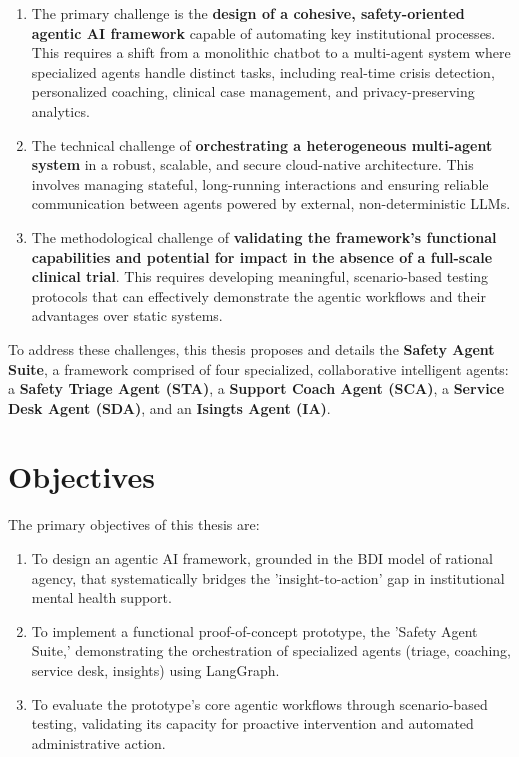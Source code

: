 \begin{enumerate}
    \item The primary challenge is the \textbf{design of a cohesive, safety-oriented agentic AI framework} capable of automating key institutional processes. This requires a shift from a monolithic chatbot to a multi-agent system where specialized agents handle distinct tasks, including real-time crisis detection, personalized coaching, clinical case management, and privacy-preserving analytics.

    \item The technical challenge of \textbf{orchestrating a heterogeneous multi-agent system} in a robust, scalable, and secure cloud-native architecture. This involves managing stateful, long-running interactions and ensuring reliable communication between agents powered by external, non-deterministic LLMs.

    \item The methodological challenge of \textbf{validating the framework's functional capabilities and potential for impact in the absence of a full-scale clinical trial}. This requires developing meaningful, scenario-based testing protocols that can effectively demonstrate the agentic workflows and their advantages over static systems.
\end{enumerate}

To address these challenges, this thesis proposes and details the \textbf{Safety Agent Suite}, a framework comprised of four specialized, collaborative intelligent agents: a \textbf{Safety Triage Agent (STA)}, a \textbf{Support Coach Agent (SCA)}, a \textbf{Service Desk Agent (SDA)}, and an \textbf{Isingts Agent (IA)}.


\section{Objectives}
\label{sec:objectives}

The primary objectives of this thesis are:
\begin{enumerate}
    \item To design an agentic AI framework, grounded in the BDI model of rational agency, that systematically bridges the 'insight-to-action' gap in institutional mental health support.
    \item To implement a functional proof-of-concept prototype, the 'Safety Agent Suite,' demonstrating the orchestration of specialized agents (triage, coaching, service desk, insights) using LangGraph.
    \item To evaluate the prototype's core agentic workflows through scenario-based testing, validating its capacity for proactive intervention and automated administrative action.
\end{enumerate}


